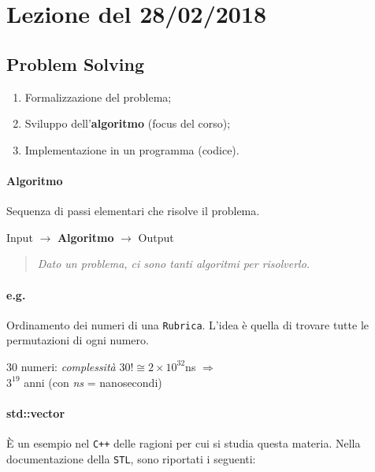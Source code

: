 \section{Lezione del 28/02/2018}

\subsection{Problem Solving}
\begin{enumerate}
	\item Formalizzazione del problema;
	\item Sviluppo dell'\textbf{algoritmo} (focus del corso);
	\item Implementazione in un programma (codice).
\end{enumerate}

\paragraph{Algoritmo} Sequenza di passi elementari che risolve il problema.\par

\begin{center}
	Input $\rightarrow$ \textbf{Algoritmo} $\rightarrow$ Output
\end{center}

\begin{quote}
	\textit{Dato un problema, ci sono tanti algoritmi per risolverlo.}
\end{quote}

\paragraph{e.g.} Ordinamento dei numeri di una \texttt{Rubrica}.
L'idea è quella di trovare tutte le permutazioni di ogni numero.\par

\begin{center}
	30 numeri: \textit{complessità} $30! \cong 2 \times 10^{32}$ns $\Rightarrow$ \\
	$3^{19}$ anni (con \textit{ns} = nanosecondi)
\end{center}

\paragraph{std::vector} È un esempio nel \texttt{C++} delle ragioni per cui si studia questa materia. Nella documentazione della \texttt{STL}, sono riportati i seguenti:

